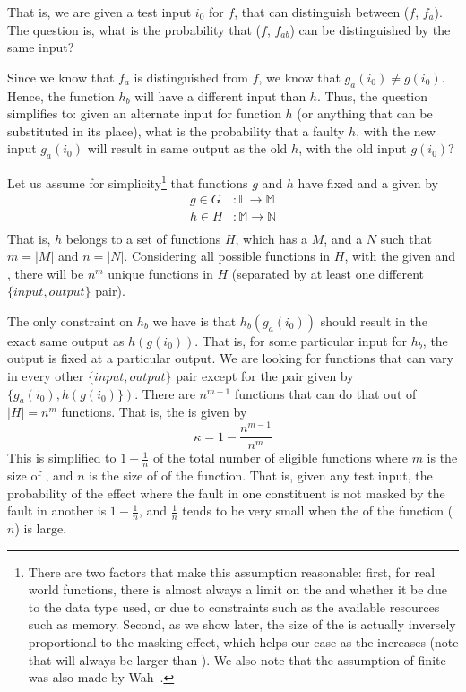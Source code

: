 \documentclass[preprint,nonatbib]{sigplanconf}\usepackage[]{graphicx}\usepackage[]{color}
\begin{document}
That is, we are given a test input $i_0$ for $f$, that can distinguish between ($f$, $f_a$).
The question is, what is the probability that ($f$, $f_{ab}$) can
be distinguished by the same input?

Since we know that $f_a$ is
distinguished from $f$, we know that $g_a(i_0) \neq g(i_0)$. Hence, the function
$h_b$ will have a different input than $h$. Thus, the question simplifies to:
given an alternate input for function $h$ (or anything that can be substituted
in its place), what is the probability that a faulty $h$, with the new input
$g_a(i_0)$ will result in same output as the old $h$, with the old input
$g(i_0)$?

Let us assume for simplicity\footnote{
There are two factors that make this assumption reasonable: first,
for real world functions, there is almost always a limit on the \finput and
\foutput whether it be due to the data type used, or due to constraints such
as the available resources such as memory. Second, as we show later, the size
of the \foutput is actually inversely proportional to the masking effect,
which helps our case as the \foutput increases (note that
\finput will always be larger than \foutput). We also note that the assumption of
finite \finput was also made by Wah~\cite{wah2000atheoretical}.
} that functions $g$ and $h$ have fixed \finput
and a \foutput given by
\begin{align*}
g \in G &: \mathbb{L} \rightarrow \mathbb{M} \\
h \in H &: \mathbb{M} \rightarrow \mathbb{N} \\
\end{align*}
That is, $h$ belongs to a set of functions $H$, which has a \finput $M$, and a
\foutput $N$ such that $m = |M|$ and $n = |N|$. Considering all possible functions
in $H$, with the given \finput and \foutput, there will be $n^m$ unique functions
in $H$ (separated by at least one different $\{input,output\}$ pair).

The only constraint on $h_b$ we have is that $h_b(g_a(i_0))$ should result in
the exact same output as $h(g(i_0))$. That is, for some particular input for
$h_b$, the output is fixed at a particular output. We are looking for
functions that can vary in every other $\{input,output\}$ pair except for the
pair given by $\{g_a(i_0), h(g(i_0)\})$. There are $n^{m-1}$ functions that
can do that out of $|H| = n^m$ functions. That is, the \kappaT is
given by
\[
  \kappa = 1 - \frac{n^{m-1}}{n^m}
\]
This is simplified to $ 1 - \frac{1}{n}$ of the total number of eligible functions
where $m$ is the size of \finput, and $n$ is the size of \foutput of the function. 
That is, given any test input, the probability of the \couplingC effect where
the fault in one constituent is not masked by the fault in another is $1 - \frac{1}{n}$,
and $\frac{1}{n}$ tends to be very small when the \foutput of the function ($n$) is
large.
\end{document}
